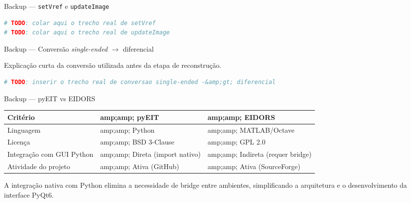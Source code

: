 \documentclass[aspectratio=169]{beamer}
\begin{document}
\begin{frame}[fragile]{Backup --- \texttt{setVref} e \texttt{updateImage}}
\begin{tcolorbox}[ufabcnote,title=Trechos de código]
\end{tcolorbox}
\begin{lstlisting}[language=Python]
# TODO: colar aqui o trecho real de setVref
# TODO: colar aqui o trecho real de updateImage
\end{lstlisting}
\end{frame}

\begin{frame}[fragile]{Backup --- Conversão \textit{single-ended} $\rightarrow$ diferencial}
\begin{tcolorbox}[ufabcbox,title=Ideia do slide]
Explicação curta da conversão utilizada antes da etapa de reconstrução.
\end{tcolorbox}
\begin{lstlisting}[language=Python]
# TODO: inserir o trecho real de conversao single-ended -&amp;gt; diferencial
\end{lstlisting}
\end{frame}

\begin{frame}{Backup --- pyEIT vs EIDORS}
\begin{tcolorbox}[ufabcbox,title=Justificativa da escolha do pyEIT]
\centering
\begin{tabular}{p{2.8cm}p{2.8cm}p{2.8cm}}
\toprule
\textbf{Critério} &amp;amp; \textbf{pyEIT} &amp;amp; \textbf{EIDORS} \\
\midrule
Linguagem &amp;amp; Python &amp;amp; MATLAB/Octave \\
Licença &amp;amp; BSD 3-Clause &amp;amp; GPL 2.0 \\
Integração com GUI Python &amp;amp; Direta (import nativo) &amp;amp; Indireta (requer bridge) \\
Atividade do projeto &amp;amp; Ativa (GitHub) &amp;amp; Ativa (SourceForge) \\
\bottomrule
\end{tabular}
\end{tcolorbox}
\vspace{0.2cm}
\begin{tcolorbox}[ufabcnote,title=Motivação da escolha]
A integração nativa com Python elimina a necessidade de bridge entre ambientes, simplificando a arquitetura e o desenvolvimento da interface PyQt6.
\end{tcolorbox}
\end{frame}
\end{document}

